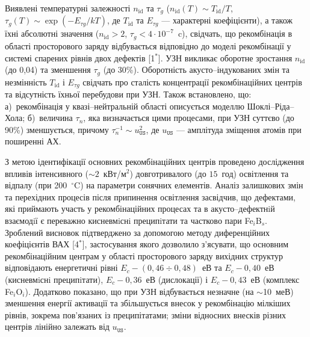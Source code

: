 Виявлені температурні залежності $n_\mathrm{id}$ та $\tau_g$
($n_{\mathrm{id}}(T) \sim T_{\mathrm{id}}/T$,
$\tau_{g}(T)\sim\exp\left(-E_{\tau g}/kT\right)$,
де $T_{\mathrm{id}}$ та $E_{\tau g}$ --- характерні коефіцієнти),
а також їхні абсолютні значення ($n_{\mathrm{id}}>2$, $\tau_{g}<4\cdot10^{-7}$~c),
свідчать, що рекомбінація в області просторового заряду відбувається відповідно до
моделі рекомбінації у системі спарених рівнів двох дефектів
[1$^*$].
УЗН викликає оборотне зростання $n_\mathrm{id}$  (до 0,04) та зменшення $\tau_g$ (до 30\%).
Оборотність акусто--індукованих змін та незмінність $T_{\mathrm{id}}$ і $E_{\tau g}$
свідчать про
сталість концентрації рекомбінаційних центрів та відсутність їхньої перебудови 
при УЗН.
Також встановлено, що:
а)~рекомбінація у квазі--нейтральній області описується моделлю Шоклі--Ріда--Хола;
б)~величина $\tau_n$, яка визначається цими процесами,
при УЗН суттєво (до 90\%) зменшується,
причому
$\tau_{n}^{-1}\sim u_\mathtt{US}^2$,
де $u_\mathtt{US}$ --- амплітуда зміщення атомів при поширенні АХ.

З метою ідентифікації основних рекомбінаційних центрів
 проведено дослідження впливів інтенсивного ($\sim\!2$~кВт/м$^2$) довготривалого (до  $15$~год) освітлення
та відпалу (при 200~$^\circ$C) на параметри сонячних елементів.
Аналіз залишкових змін та перехідних процесів після припинення освітлення засвідчив, що дефектами, які приймають участь у рекомбінаційних процесах та в акусто--дефектнiй взаємодiї є переважно кисневмiснi преципiтати та
частково пари Fe$_i$B$_s$.
Зроблений висновок підтверджено за допомогою методу диференційних коефіцієнтів ВАХ
[4$^*$],
застосування якого дозволило з'ясувати, що основним рекомбінаційним центрам у області просторового заряду вихідних структур відповідають енергетичні рівні
$E_c-(0,46\div0,48)$~еВ та $E_c-0,40$~еВ (кисневмiснi преципiтати),
$E_c-0,36$~еВ (дислокації) і
$E_c-0,43$~еВ (комплекс Fe$_i$O$_i$).
Додатково показано, що
при УЗН відбувається незначне (на $\sim$10~меВ) зменшення енергії активації та
збільшується внесок у рекомбінацію мілкіших рівнів, зокрема пов'язаних із преципітатами;
зміни відносних внесків різних центрів лінійно залежать від $u_\mathtt{US}$.

